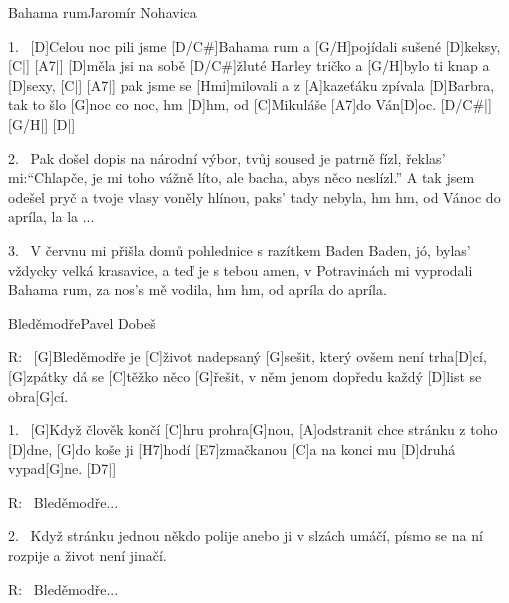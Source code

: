 \begin{song}{Bahama rum}{Jaromír Nohavica}

\begin{xverse}{1.~}
[D]Celou noc pili jsme [D/C#]Bahama rum a [G/H]pojídali sušené [D]keksy, [C|]{} [A7|]{}
[D]měla jsi na sobě [D/C#]{žluté} Harley tričko a [G/H]bylo ti knap a [D]sexy, [C|]{} [A7|]{}
pak jsme se [Hmi]milovali a z [A]kazeťáku zpívala [D]Barbra,
tak to šlo [G]noc co noc, hm [D]hm, od [C]Mikuláše [A7]do Ván[D]oc. [D/C#|]{} [G/H|]{} [D|]{}
\end{xverse}

\begin{xverse}{2.~}
Pak došel dopis na národní výbor, tvůj soused je patrně fízl,
řeklas' mi:``Chlapče, je mi toho vážně líto,
ale bacha, abys něco neslízl.''
A tak jsem odešel pryč a tvoje vlasy voněly hlínou,
paks' tady nebyla, hm hm, od Vánoc do apríla, la la ...
\end{xverse}

\begin{xverse}{3.~}
V červnu mi přišla domů pohlednice s razítkem Baden Baden,
jó, bylas' vždycky velká krasavice, a teď je s tebou amen,
v Potravinách mi vyprodali Bahama rum,
za nos's mě vodila, hm hm, od apríla do apríla.
\end{xverse}

\end{song}



\begin{song}{Bleděmodře}{Pavel Dobeš}

\begin{xverse}{R:~}
[G]Bleděmodře je [C]{ži}vot nadepsaný [G]sešit,
který ovšem není trha[D]cí,
[G]zpátky dá se [C]těžko něco [G]{ře}šit,
v něm jenom dopředu každý [D]list se obra[G]cí.
\end{xverse}

\begin{xverse}{1.~}
[G]Když člověk končí [C]hru prohra[G]nou,
[A]odstranit chce stránku z toho [D]dne,
[G]do koše ji [H7]hodí [E7]zmačkanou
[C]a na konci mu [D]druhá vypad[G]ne. [D7|]{}
\end{xverse}

\begin{xverse}{R:~}
Bleděmodře...
\end{xverse}

\begin{xverse}{2.~}
Když stránku jednou někdo polije
anebo ji v slzách umáčí,
písmo se na ní rozpije
a život není jinačí.
\end{xverse}

\begin{xverse}{R:~}
Bleděmodře...
\end{xverse}

\end{song}


